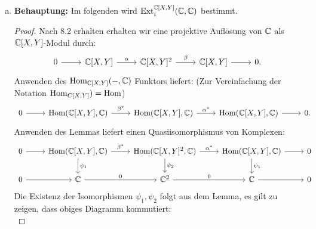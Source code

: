 \documentclass{nico_zettelsose21}
\newcommand{\ggt}{\operatorname{ggT}}
\newcommand{\Zn}{\Z/n\Z}
\newcommand{\Ze}{\Z/e\Z}
\newcommand{\Zd}{\Z/d\Z}
\newcommand{\Ext}{\operatorname{Ext}}
\renewcommand{\im}{\operatorname{im}}
\begin{document}
\begin{enumerate}[(a)]
\begin{proof}
\begin{align*}
                    &= ((e\Z : \frac{n}{d}\Z)/e\Z)/(\ggt(d,e)\Z/e\Z) \\
                    &= (e\Z : \frac{n}{d}\Z)/\ggt(d,e)\Z \\
                    &= \left( \frac{e}{\ggt(e,\frac{n}{d})}\Z \right)/\ggt(d,e)\Z \\
                    \Ext_{2j}^{\Zn}(\Zd,\Ze) &= \ker(\Ze \stackrel{d \cdot}{\rightarrow} \Ze)/\im(\Ze \stackrel{\frac{n}{d} \cdot}{\rightarrow} \Ze)\\
                    &= \left( \frac{e}{\ggt(e,d)}\Z \right)/\ggt\left(\frac{n}{d}, e\right)\Z
                \end{align*}
            \end{proof}
    
    \item   \textbf{Behauptung:} Im folgenden wird $\Ext_{i}^{\C[X,Y]}(\C,\C)$ bestimmt.
            \begin{proof}
                Nach 8.2 erhalten erhalten wir eine projektive Auflösung von $\mathbb{C}$ als $\mathbb{C}[X,Y]$-Modul durch:
                \[
                \begin{tikzcd}
                    0 \arrow[r] &\C[X,Y] \arrow[r,"\alpha"] &\C[X,Y]^{2} \arrow[r,"\beta"] & \C[X,Y] \arrow[r] &0.
                \end{tikzcd} 
                \]
                Anwenden des $\operatorname{Hom}_{\mathbb{C}[X,Y]}(-,\mathbb{C})$ Funktors liefert: (Zur Vereinfachung der Notation $\operatorname{Hom}_{C[X,Y]}) = \operatorname{Hom}$)
                \[
                \begin{tikzcd}
                    0 \arrow[r] &\Hom(\C[X,Y],\C) \arrow[r, "\beta^{*}"] &\Hom(\C[X,Y],\C) \arrow[r, "\alpha^{*}"] &\Hom(\C[X,Y],\C) \arrow[r] &0.
                \end{tikzcd}
                \]
                Anwenden des Lemmas liefert einen Quasiisomorphismus von Komplexen:
                \[
                \begin{tikzcd}
                    0 \arrow[r] &\Hom(\C[X,Y],\C) \arrow[r, "\beta^{*}"] \arrow[d, "\psi_{1}"] &\Hom(\C[X,Y]^{2},\C) \arrow[r, "\alpha^{*}"] \arrow[d, "\psi_{2}"] &\Hom(\C[X,Y],\C) \arrow[r] \arrow[d, "\psi_{1}"] &0 \\
                    0 \arrow[r] &\C \arrow[r, "0"] &\C^{2} \arrow[r, "0"] &\C \arrow[r] &0
                \end{tikzcd} 
                \]
                Die Existenz der Isomorphismen $\psi_{1},\psi_{2}$ folgt aus dem Lemma, es gilt zu zeigen, dass obiges Diagramm kommutiert: \\

\end{proof}
\end{enumerate}
\end{document}
